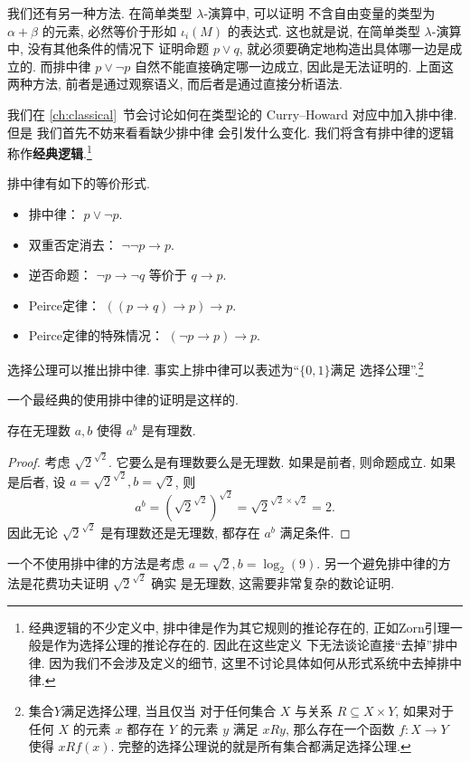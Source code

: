 我们还有另一种方法. 在简单类型 \(\lambda\)-演算中, 可以证明
不含自由变量的类型为 \(\alpha + \beta\) 的元素,
必然等价于形如 \(\iota_i(M)\) 的表达式. 这也就是说,
在简单类型 \(\lambda\)-演算中, 没有其他条件的情况下
证明命题 \(p\vee q\), 就必须要确定地构造出具体哪一边是成立的.
而排中律 \(p \vee \neg p\) 自然不能直接确定哪一边成立,
因此是无法证明的. 上面这两种方法, 前者是通过观察语义,
而后者是通过直接分析语法.

我们在 \ref{ch:classical}~节会讨论如何在类型论的
Curry--Howard 对应中加入排中律. 但是
我们首先不妨来看看缺少排中律
会引发什么变化. 我们将含有排中律的逻辑
称作\textbf{经典逻辑}.\footnote{经典逻辑的不少定义中,
排中律是作为其它规则的推论存在的,
正如Zorn引理一般是作为选择公理的推论存在的. 因此在这些定义
下无法谈论直接“去掉”排中律. 因为我们不会涉及定义的细节,
这里不讨论具体如何从形式系统中去掉排中律.}
\begin{theorem}
排中律有如下的等价形式.
\begin{itemize}
\item 排中律： \(p \vee \neg p\).
\item 双重否定消去： \(\neg\neg p \to p\).
\item 逆否命题： \(\neg p \to \neg q\) 等价于 \(q \to p\).
\item Peirce定律： \(((p \to q) \to p) \to p\).
\item Peirce定律的特殊情况： \((\neg p\to p) \to p\).
\end{itemize}
\end{theorem}
\begin{theorem}[Diaconescu]\label{ch:diaconescu}
选择公理可以推出排中律.
事实上排中律可以表述为“\(\{0,1\}\)满足
选择公理”.\footnote{集合\(Y\)满足选择公理, 当且仅当
对于任何集合 \(X\) 与关系 \(R \subseteq X \times Y\), 如果对于
任何 \(X\) 的元素 \(x\) 都存在 \(Y\) 的元素 \(y\)
满足 \(xRy\), 那么存在一个函数 \(f : X \to Y\) 使得
\(xRf(x)\). 完整的选择公理说的就是所有集合都满足选择公理.}
\end{theorem}

一个最经典的使用排中律的证明是这样的.
\begin{theorem}
存在无理数 \(a,b\) 使得 \(a^b\) 是有理数.
\end{theorem}
\begin{proof}
考虑 \({\sqrt2}^{\sqrt2}\). 它要么是有理数要么是无理数.
如果是前者, 则命题成立. 如果是后者, 设 \(a = {\sqrt2}^{\sqrt2},
b = \sqrt 2\), 则
\[a^b = \left({\sqrt2}^{\sqrt2}\right)^{\sqrt2} = {\sqrt2}^{\sqrt2\times\sqrt2} = 2.\]
因此无论 \({\sqrt2}^{\sqrt2}\) 是有理数还是无理数,
都存在 \(a^b\) 满足条件.
\end{proof}
\begin{remark}
一个不使用排中律的方法是考虑 \(a = \sqrt 2, b = \log_2(9)\).
另一个避免排中律的方法是花费功夫证明 \({\sqrt2}^{\sqrt2}\) 确实
是无理数, 这需要非常复杂的数论证明.
\end{remark}

